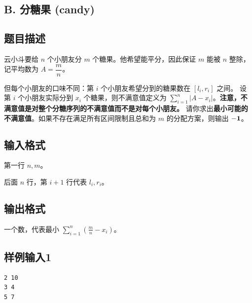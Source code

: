
\begin{center}
    \section{B. 分糖果 (candy)}
\end{center}

\subsection{题目描述}

云小斗要给 $n$ 个小朋友分 $m$ 个糖果。他希望能平分，因此保证 $m$ 能被 $n$ 整除，记平均数为 $A=\dfrac{m}{n}$。

但每个小朋友的口味不同：第 $i$ 个小朋友希望分到的糖果数在 $[l_i, r_i]$ 之间。
设第 $i$ 个小朋友实际分到 $x_i$ 个糖果，则不满意值定义为 $\sum_{i=1}^{n} |A-x_i|$。\textbf{注意，不满意值是对整个分糖序列的不满意值而不是对每个小朋友。}
请你求出\textbf{最小可能的不满意值}。如果不存在满足所有区间限制且总和为 $m$ 的分配方案，则输出 $\bf{-1}$。

\subsection{输入格式}

第一行 $n,m$。

后面 $n$ 行，第 $i+1$ 行代表 $l_i,r_i$。

\subsection{输出格式}

一个数，代表最小 $\sum_{i=1}^{n} (\frac{m}{n}-x_i)$。

\subsection{样例输入1}

\begin{lstlisting}
2 10
3 4
5 7
\end{lstlisting}

